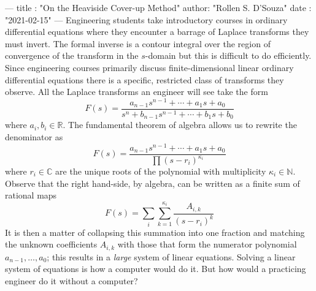---
title :   "On the Heaviside Cover-up Method"
author:   "Rollen S. D'Souza"
date  :   "2021-02-15"
---
Engineering students take introductory courses in ordinary differential equations where they encounter a barrage of Laplace transforms they must invert.
The formal inverse is a contour integral over the region of convergence of the transform in the \(s\)-domain but this is difficult to do efficiently.
Since engineering courses primarily discuss finite-dimensional linear ordinary differential equations there is a specific, restricted class of transforms they observe.
All the Laplace transforms an engineer will see take the form
\[
  F(s) = \frac{a_{n-1} s^{n-1} + \cdots + a_1 s + a_0}{s^n + b_{n-1} s^{n-1} + \cdots + b_1 s + b_0}
\]
where \(a_i, b_i \in \mathbb{R}.\)
The fundamental theorem of algebra allows us to rewrite the denominator as
\[
  F(s) = \frac{a_{n-1} s^{n-1} + \cdots + a_1 s + a_0}{\prod (s - r_i)^{\kappa_i}}
\]
where \(r_i \in \mathbb{C}\) are the unique roots of the polynomial with multiplicity \(\kappa_i \in \mathbb{N}.\)
Observe that the right hand-side, by algebra, can be written as a finite sum of rational maps
\[
  F(s) = \sum_i \sum_{k = 1}^{\kappa_i} \frac{A_{i, k}}{(s - r_i)^k}
\]
It is then a matter of collapsing this summation into one fraction and matching the unknown coefficients \(A_{i, k}\) with those that form the numerator polynomial \(a_{n-1},\ldots, a_0\); this results in a \emph{large} system of linear equations.
Solving a linear system of equations is how a computer would do it.
But how would a practicing engineer do it without a computer?

